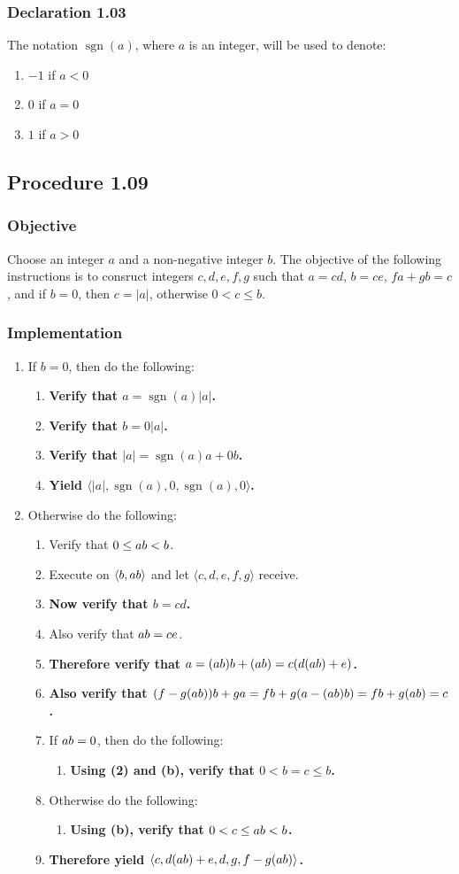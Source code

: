 \documentclass[twocolumn]{article}
\DeclareMathOperator{\sgn}{sgn}
\let\div\relax
\DeclareMathOperator{\div}{div}
\let\mod\relax
\DeclareMathOperator{\mod}{mod}
\newcommand{\declaration}[1]{\subsubsection*{Declaration #1}\label{sec:declaration #1}}
\newcommand{\procedure}[2][]{\subsection*{Procedure #2 \ifthenelse{\equal{#1}{}}{}{(#1)}}\label{sec:procedure #2}}
\newcommand{\objective}{\subsubsection*{Objective}}
\newcommand{\implementation}{\subsubsection*{Implementation}}
\newcommand{\procedurehr}[2][]{\hyperref[sec:procedure #2]{\ifthenelse{\equal{#1}{}}{procedure #2}{#1}}}
\begin{document}
		\declaration{1.03}
			The notation $\sgn(a)$, where $a$ is an integer, will be used to denote:
			\begin{enumerate}
				\item $-1$ if $a<0$
				\item $0$ if $a=0$
				\item $1$ if $a>0$
			\end{enumerate}
		\procedure{1.09}
			\objective
				Choose an integer $a$ and a non-negative integer $b$. The objective of the following instructions is to consruct integers $c,d,e,f,g$ such that $a=cd$, $b=ce$, $fa+gb=c$, and if $b=0$, then $c=\lvert a\rvert$, otherwise $0<c\le b$.
			\implementation
				\begin{enumerate}
					\item If $b=0$, then do the following:
					\begin{enumerate}
						\item \textbf{Verify that $a=\sgn(a)\lvert a\rvert$.}
						\item \textbf{Verify that $b=0\lvert a\rvert$.}
						\item \textbf{Verify that $\lvert a\rvert=\sgn(a)a+0b$.}
						\item \textbf{Yield $\langle\lvert a\rvert,\sgn(a),0,\sgn(a),0\rangle$.}
					\end{enumerate}
					\item Otherwise do the following:
					\begin{enumerate}
						\item Verify that $0\le a\mod b<b$.
						\item Execute \procedurehr{1.09} on $\langle b,a\mod b\rangle$ and let $\langle c,d,e,f,g\rangle$ receive.
						\item \textbf{Now verify that $b=cd$.}
						\item Also verify that $a\mod b=ce$.
						\item \textbf{Therefore verify that $a=(a\div b)b+(a\mod b)=c(d(a\div b)+e)$.}
						\item \textbf{Also verify that $(f-g(a\div b))b+ga=fb+g(a-(a\div b)b)=fb+g(a\mod b)=c$.}
						\item If $a\mod b=0$, then do the following:
						\begin{enumerate}
							\item \textbf{Using (2) and (b), verify that $0<b=c\le b$.}
						\end{enumerate}
						\item Otherwise do the following:
						\begin{enumerate}
							\item \textbf{Using (b), verify that $0<c\le a\mod b<b$.}
						\end{enumerate}
						\item \textbf{Therefore yield $\langle c,d(a\div b)+e,d,g,f-g(a\div b)\rangle$.}
					\end{enumerate}
				\end{enumerate}
\end{document}
